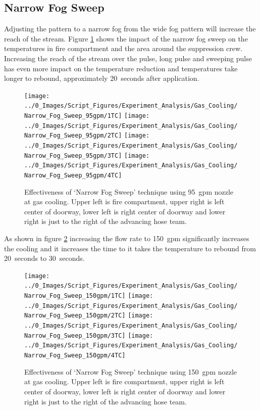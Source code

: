 \documentclass[12pt,oneside]{book}
\begin{document}
\subsection {Narrow Fog Sweep}
Adjusting the pattern to a narrow fog from the wide fog pattern will increase the reach of the stream. Figure \ref{fig:gas_narrow_fog_95} shows the impact of the narrow fog sweep on the temperatures in fire compartment and the area around the suppression crew. Increasing the reach of the stream over the pulse, long pulse and sweeping pulse has even more impact on the temperature reduction and temperatures take longer to rebound, approximately 20~seconds after application.

\begin{figure}[H]
\centering
\texttt{[image: ../0\_Images/Script\_Figures/Experiment\_Analysis/Gas\_Cooling/Narrow\_Fog\_Sweep\_95gpm/1TC]}
\texttt{[image: ../0\_Images/Script\_Figures/Experiment\_Analysis/Gas\_Cooling/Narrow\_Fog\_Sweep\_95gpm/2TC]}
\texttt{[image: ../0\_Images/Script\_Figures/Experiment\_Analysis/Gas\_Cooling/Narrow\_Fog\_Sweep\_95gpm/3TC]}
\texttt{[image: ../0\_Images/Script\_Figures/Experiment\_Analysis/Gas\_Cooling/Narrow\_Fog\_Sweep\_95gpm/4TC]}
\caption[Gas Cooling - Narrow Fog Sweep 95~gpm]{Effectiveness of `Narrow Fog Sweep' technique using 95~gpm nozzle at gas cooling. Upper left is fire compartment, upper right is left center of doorway, lower left is right center of doorway and lower right is just to the right of the advancing hose team.}
\label{fig:gas_narrow_fog_95}
\end{figure}

As shown in figure \ref{fig:gas_narrow_fog_150} increasing the flow rate to 150~gpm significantly increases the cooling and it increases the time to it takes the temperature to rebound from 20~seconds to 30~seconds. 

\begin{figure}[H]
\centering
\texttt{[image: ../0\_Images/Script\_Figures/Experiment\_Analysis/Gas\_Cooling/Narrow\_Fog\_Sweep\_150gpm/1TC]}
\texttt{[image: ../0\_Images/Script\_Figures/Experiment\_Analysis/Gas\_Cooling/Narrow\_Fog\_Sweep\_150gpm/2TC]}
\texttt{[image: ../0\_Images/Script\_Figures/Experiment\_Analysis/Gas\_Cooling/Narrow\_Fog\_Sweep\_150gpm/3TC]}
\texttt{[image: ../0\_Images/Script\_Figures/Experiment\_Analysis/Gas\_Cooling/Narrow\_Fog\_Sweep\_150gpm/4TC]}
\caption[Gas Cooling - Narrow Fog Sweep 150~gpm]{Effectiveness of `Narrow Fog Sweep' technique using 150~gpm nozzle at gas cooling. Upper left is fire compartment, upper right is left center of doorway, lower left is right center of doorway and lower right is just to the right of the advancing hose team.}
\label{fig:gas_narrow_fog_150}
\end{figure}
\end{document}
